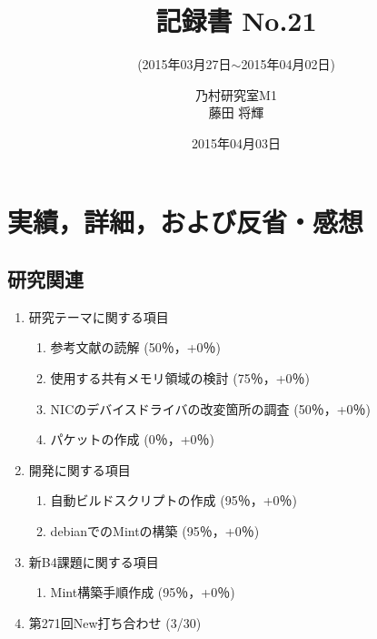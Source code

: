 \documentclass[fleqn, 12pt]{extarticlej}
\subtitle{(2015年03月27日$\sim$2015年04月02日)}
\author{乃村研究室M1\\藤田 将輝}
\date{2015年04月03日}
\title{記録書 No.21}
\begin{document}
\maketitle
\section{実績，詳細，および反省・感想}
\subsection{研究関連}
\label{sec-2-1}
\begin{enumerate}
    \item 研究テーマに関する項目
    \hfill
    \label{enum-research1}
    \begin{enumerate}
        \item 参考文献の読解
        \hfill
        \label{enum-1-A}
        (50％，+0％)
        \item 使用する共有メモリ領域の検討
        \hfill
        \label{enum-1-B}
        (75％，+0％)
        \item NICのデバイスドライバの改変箇所の調査
        \hfill
        \label{enum-1-C}
        (50％，+0％)
        \item パケットの作成
            \hfill
            \label{enum-1-D}
            (0％，+0％)
    \end{enumerate}
    \item 開発に関する項目
    \hfill
    \label{enum-research2}
    \begin{enumerate}

        \item 自動ビルドスクリプトの作成
        \hfill
        \label{enum-2-A}
        (95％，+0％)
        \item debianでのMintの構築
        \hfill
        \label{enum-2-A}
        (95％，+0％)
    \end{enumerate}
    \item 新B4課題に関する項目
    \hfill
    \label{enum-research3}
    \begin{enumerate}
        \item Mint構築手順作成
        \hfill
        \label{enum-3-A}
        (95％，+0％)
        
    \end{enumerate}
    \item 第271回New打ち合わせ 
    \hfill
    \label{enum-research3}
    (3/30)

    \end{enumerate}
\end{document}
